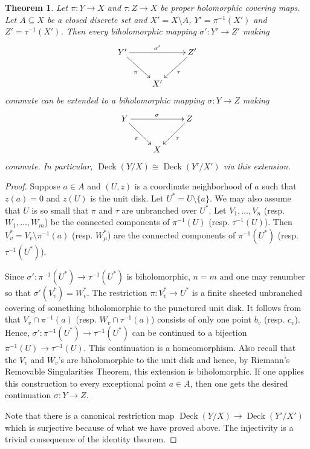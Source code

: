 \documentclass[12pt]{article}
\theoremstyle{thmstyle}
\newtheorem{theorem}{Theorem}[section]
\theoremstyle{defstyle}
\begin{document}
\begin{theorem}
    Let $\pi: Y\to X$ and $\tau: Z\to X$ be proper holomorphic covering maps. Let $A\subseteq X$ be a closed discrete set and $X' = X\setminus A$, $Y' = \pi^{-1}(X')$ and $Z' = \tau^{-1}(X')$. Then every biholomorphic mapping $\sigma': Y'\to Z'$ making 
    \begin{equation*}
        \xymatrix {
            Y'\ar[rr]^{\sigma'}\ar[rd]_{\pi} & & Z'\ar[ld]^{\tau}\\
            & X' &
        }
    \end{equation*}
    commute can be extended to a biholomorphic mapping $\sigma: Y\to Z$ making 
    \begin{equation*}
        \xymatrix {
            Y\ar[rr]^{\sigma}\ar[rd]_{\pi} & & Z\ar[ld]^{\tau}\\
            & X &
        }
    \end{equation*}
    commute. In particular, $\operatorname{Deck}(Y/X)\cong\operatorname{Deck}(Y'/X')$ via this extension.
\end{theorem}
\begin{proof}
    Suppose $a\in A$ and $(U, z)$ is a coordinate neighborhood of $a$ such that $z(a) = 0$ and $z(U)$ is the unit disk. Let $U^\ast = U\setminus\{a\}$. We may also assume that $U$ is so small that $\pi$ and $\tau$ are unbranched over $U^\ast$. Let $V_1,\dots, V_n$ (resp. $W_1,\dots, W_m$) be the connected components of $\pi^{-1}(U)$ (resp. $\tau^{-1}(U)$). Then $V^\ast_v = V_v\setminus\pi^{-1}(a)$ (resp. $W_\mu^\ast$) are the connected components of $\pi^{-1}(U^\ast)$ (resp. $\tau^{-1}(U^\ast)$).

    Since $\sigma': \pi^{-1}(U^\ast)\to\tau^{-1}(U^\ast)$ is biholomorphic, $n = m$ and one may renumber so that $\sigma'(V^\ast_v) = W^\ast_v$. The restriction $\pi: V_v^\ast\to U^\ast$ is a finite sheeted unbranched covering of something biholomorphic to the punctured unit disk. It follows from  that $V_v\cap\pi^{-1}(a)$ (resp. $W_v\cap\tau^{-1}(a)$) consists of only one point $b_v$ (resp. $c_v$). Hence, $\sigma': \pi^{-1}(U^\ast)\to\tau^{-1}(U^\ast)$ can be continued to a bijection $\pi^{-1}(U)\to\tau^{-1}(U)$. This continuation is a homeomorphism. Also recall that the $V_v$ and $W_v$'s are biholomorphic to the unit disk and hence, by Riemann's Removable Singularities Theorem, this extension is biholomorphic. If one applies this construction to every exceptional point $a\in A$, then one gets the desired continuation $\sigma: Y\to Z$.

    Note that there is a canonical restriction map $\operatorname{Deck}(Y/X)\to\operatorname{Deck}(Y'/X')$ which is surjective because of what we have proved above. The injectivity is a trivial consequence of the identity theorem.
\end{proof}
\end{document}
